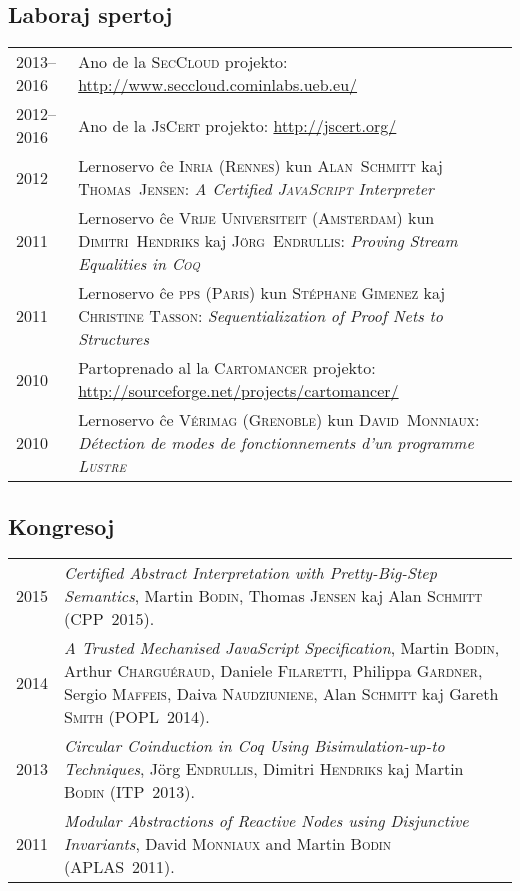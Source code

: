 \documentclass[12pt,a4paper]{article}
\makeatletter
\newcommand{\en}[1]{\foreignlanguage{english}{\textit{#1}}}
\newenvironment{datecvsection}[1]%
               {\subsection*{#1}%
                 \noindent \begin{tabular}{@{}p{\annee}p{\texte}@{}}}
               {\end{tabular}}
\makeatother
\begin{document}
\begin{datecvsection}{Laboraj spertoj}

	2013–2016 & Ano de la \textsc{SecCloud} projekto:  \url{http://www.seccloud.cominlabs.ueb.eu/} \\

	2012–2016 & Ano de la \textsc{JsCert} projekto:  \url{http://jscert.org/} \\

	2012 & Lernoservo ĉe \textsc{Inria} (\textsc{Rennes}) kun \textsc{Alan~Schmitt} kaj \textsc{Thomas~Jensen}:
	\en{\textit{A Certified \textsc{JavaScript} Interpreter}} \\

	2011 & Lernoservo ĉe \textsc{Vrĳe Universiteit} (\textsc{Amsterdam}) kun \textsc{Dimitri~Hendriks} kaj \textsc{Jörg~Endrullis}:
	\en{\textit{Proving Stream Equalities in \textsc{Coq}}} \\

	2011 & Lernoservo ĉe \textsc{pps} (\textsc{Paris}) kun \textsc{Stéphane Gimenez} kaj \textsc{Christine Tasson}:
	\en{\textit{Sequentialization of Proof Nets to Structures}} \\

	2010 & Partoprenado al la \textsc{Cartomancer} projekto:  \url{http://sourceforge.net/projects/cartomancer/} \\

	2010 & Lernoservo ĉe \textsc{Vérimag} (\textsc{Grenoble}) kun \textsc{David~Monniaux}:
	\textit{Détection de modes de fonctionnements d’un programme \textsc{Lustre}} \\

\end{datecvsection}

\begin{datecvsection}{Kongresoj}

  2015 & \textit{Certified Abstract Interpretation with Pretty-Big-Step Semantics}, Martin \textsc{Bodin}, Thomas \textsc{Jensen} kaj Alan \textsc{Schmitt} (CPP~2015). \\

  2014 & \textit{A Trusted Mechanised JavaScript Specification}, Martin \textsc{Bodin}, Arthur \textsc{Charguéraud}, Daniele \textsc{Filaretti}, Philippa \textsc{Gardner}, Sergio \textsc{Maffeis}, Daiva \textsc{Naudziuniene}, Alan \textsc{Schmitt} kaj Gareth \textsc{Smith} (POPL~2014). \\

  2013 & \textit{Circular Coinduction in Coq Using Bisimulation-up-to Techniques}, Jörg \textsc{Endrullis}, Dimitri \textsc{Hendriks} kaj Martin \textsc{Bodin} (ITP~2013). \\

  2011 & \textit{Modular Abstractions of Reactive Nodes using Disjunctive Invariants}, David \textsc{Monniaux} and Martin \textsc{Bodin} (APLAS~2011). \\

\end{datecvsection}
\end{document}
